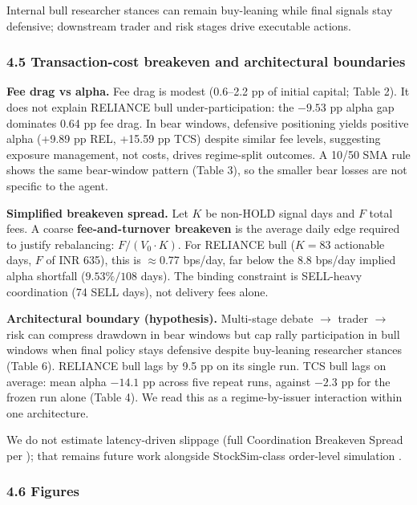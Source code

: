 \documentclass{article}
\begin{document}
Internal bull researcher stances can remain buy-leaning while
final signals stay defensive; downstream trader and risk
stages drive executable actions.

\subsubsection{4.5 Transaction-cost breakeven and architectural
boundaries}\label{transaction-cost-breakeven-and-architectural-boundaries}

\textbf{Fee drag vs alpha.} Fee drag is modest (0.6--2.2 pp of initial
capital; Table 2). It does not explain RELIANCE bull
under-participation: the $-9.53$ pp alpha gap dominates
0.64 pp fee drag. In bear windows, defensive positioning yields
positive alpha (+9.89 pp REL, +15.59 pp TCS) despite similar
fee levels, suggesting exposure management, not costs, drives
regime-split outcomes. A 10/50 SMA rule shows the same bear-window
pattern (Table 3), so the smaller bear losses are not specific to the
agent.

\textbf{Simplified breakeven spread.} Let $K$ be non-HOLD signal days
and $F$ total fees. A coarse \textbf{fee-and-turnover breakeven} is the
average daily edge required to justify rebalancing: $F / (V_0 \cdot K)$.
For RELIANCE bull ($K=83$ actionable days, $F$ of INR 635), this
is $\approx$0.77 bps/day, far below the 8.8 bps/day
implied alpha shortfall ($9.53\%/108$ days). The binding
constraint is SELL-heavy coordination (74 SELL days), not
delivery fees alone.

\textbf{Architectural boundary (hypothesis).} Multi-stage debate $\rightarrow$
trader $\rightarrow$ risk can compress drawdown in bear windows but
cap rally participation in bull windows when final policy stays
defensive despite buy-leaning researcher stances (Table 6). RELIANCE
bull lags by 9.5 pp on its single run. TCS bull lags on average:
mean alpha $-14.1$ pp across five repeat runs, against $-2.3$ pp for the
frozen run alone (Table 4). We read this as a regime-by-issuer
interaction within one architecture.

We do not estimate latency-driven slippage (full
Coordination Breakeven Spread per \citealp{nguyen2026toward}); that
remains future work alongside StockSim-class order-level simulation
\citep{papadakis2025stocksim}.

\subsubsection{4.6 Figures}\label{figures}
\end{document}
